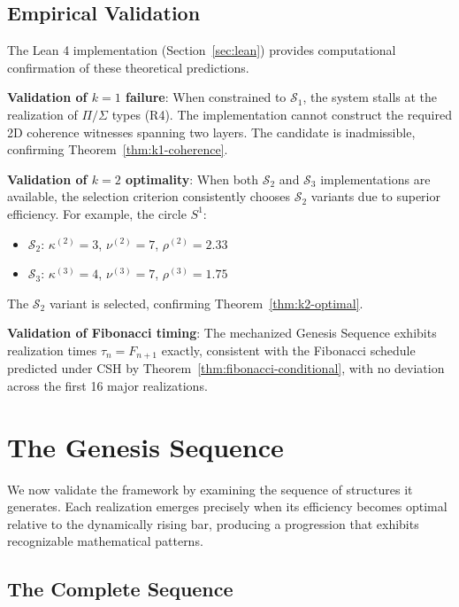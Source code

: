 \documentclass[11pt]{article}
\theoremstyle{definition}
\theoremstyle{plain}
\theoremstyle{remark}
\begin{document}
\subsection{Empirical Validation}

The Lean 4 implementation (Section~\ref{sec:lean}) provides computational confirmation of these theoretical predictions.

\textbf{Validation of $k=1$ failure}: When constrained to $\mathcal{S}_1$, the system stalls at the realization of $\Pi/\Sigma$ types (R4). The implementation cannot construct the required 2D coherence witnesses spanning two layers. The candidate is inadmissible, confirming Theorem~\ref{thm:k1-coherence}.

\textbf{Validation of $k=2$ optimality}: When both $\mathcal{S}_2$ and $\mathcal{S}_3$ implementations are available, the selection criterion consistently chooses $\mathcal{S}_2$ variants due to superior efficiency. For example, the circle $S^1$:
\begin{itemize}
\item $\mathcal{S}_2$: $\kappa^{(2)} = 3$, $\nu^{(2)} = 7$, $\rho^{(2)} = 2.33$
\item $\mathcal{S}_3$: $\kappa^{(3)} = 4$, $\nu^{(3)} = 7$, $\rho^{(3)} = 1.75$
\end{itemize}

The $\mathcal{S}_2$ variant is selected, confirming Theorem~\ref{thm:k2-optimal}.

\textbf{Validation of Fibonacci timing}: The mechanized Genesis Sequence exhibits realization times $\tau_n = F_{n+1}$ exactly, consistent with the Fibonacci schedule predicted under CSH by Theorem~\ref{thm:fibonacci-conditional}, with no deviation across the first 16 major realizations.

\section{The Genesis Sequence}
\label{sec:genesis}

We now validate the framework by examining the sequence of structures it generates. Each realization emerges precisely when its efficiency becomes optimal relative to the dynamically rising bar, producing a progression that exhibits recognizable mathematical patterns.

\subsection{The Complete Sequence}
\end{document}
